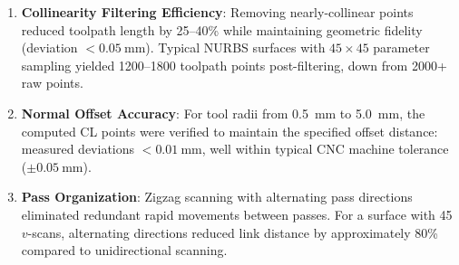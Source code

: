 \documentclass[a4paper,12pt]{article}
\begin{document}
\begin{enumerate}
  \item \textbf{Collinearity Filtering Efficiency}: Removing nearly-collinear
    points reduced toolpath length by 25--40\% while maintaining geometric
    fidelity (deviation $< 0.05~\text{mm}$). Typical NURBS surfaces with
    $45 \times 45$ parameter sampling yielded 1200--1800 toolpath points
    post-filtering, down from 2000+ raw points.

  \item \textbf{Normal Offset Accuracy}: For tool radii from 0.5~mm to
    5.0~mm, the computed CL points were verified to maintain the specified
    offset distance: measured deviations $< 0.01~\text{mm}$, well within
    typical CNC machine tolerance ($\pm 0.05~\text{mm}$).

  \item \textbf{Pass Organization}: Zigzag scanning with alternating pass
    directions eliminated redundant rapid movements between passes. For a
    surface with 45 $v$-scans, alternating directions reduced link distance
    by approximately 80\% compared to unidirectional scanning.
\end{enumerate}



\end{document}
